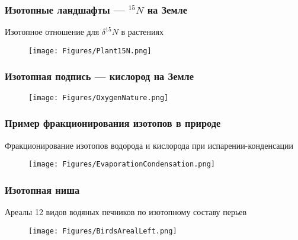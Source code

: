 \begin{frame}
\frametitle{Изотопные ландшафты --- $^{15}N$ на Земле}

Изотопное отношение для $\delta^{15}N$ в растениях	

\begin{figure}[ht] 
	\centering\small
	\unitlength=1mm
	{\texttt{[image: Figures/Plant15N.png]}} 
\end{figure}


\end{frame}

\begin{frame}
\frametitle{ Изотопная подпись  --- кислород  на Земле}
\begin{figure}[ht] 
	\centering\small
	\unitlength=1mm
	\texttt{[image: Figures/OxygenNature.png]} 
\end{figure}

\end{frame}


\begin{frame}
\frametitle{Пример фракционирования изотопов в природе}

Фракционирование изотопов водорода и кислорода при испарении-конденсации
\begin{figure}[ht] 
	\centering\small
	\unitlength=1mm
	\texttt{[image: Figures/EvaporationCondensation.png]} 
\end{figure}

\end{frame}


\begin{frame}
\frametitle{Изотопная ниша }
Ареалы 12 видов водяных печников по изотопному составу перьев 
\begin{figure}[ht] 
	\centering\small
	\unitlength=1mm
	\texttt{[image: Figures/BirdsArealLeft.png]}
\end{figure}
\end{frame}

